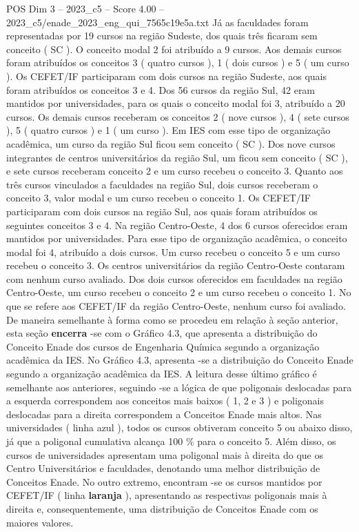 \begin{textsample}{POS Dim 3 – 2023\_c5 – Score 4.00 – 2023\_c5/enade\_2023\_eng\_qui\_7565c19e5a.txt}
Já as faculdades foram representadas por 19 cursos na região Sudeste, dos quais três ficaram sem conceito ( SC ).
O conceito modal 2 foi atribuído a 9 cursos.
Aos demais cursos foram atribuídos os conceitos 3 ( quatro cursos ), 1 ( dois cursos ) e 5 ( um curso ).
Os CEFET/IF participaram com dois cursos na região Sudeste, aos quais foram atribuídos os conceitos 3 e 4.
Dos 56 cursos da região Sul, 42 eram mantidos por universidades, para os quais o conceito modal foi 3, atribuído a 20 cursos.
Os demais cursos receberam os conceitos 2 ( nove cursos ), 4 ( sete cursos ), 5 ( quatro cursos ) e 1 ( um curso ).
Em IES com esse tipo de organização acadêmica, um curso da região Sul ficou sem conceito ( SC ).
Dos nove cursos integrantes de centros universitários da região Sul, um ficou sem conceito ( SC ), e sete cursos receberam conceito 2 e um curso recebeu o conceito 3.
Quanto aos três cursos vinculados a faculdades na região Sul, dois cursos receberam o conceito 3, valor modal e um curso recebeu o conceito 1.
Os CEFET/IF participaram com dois cursos na região Sul, aos quais foram atribuídos os seguintes conceitos 3 e 4.
Na região Centro-Oeste, 4 dos 6 cursos oferecidos eram mantidos por universidades.
Para esse tipo de organização acadêmica, o conceito modal foi 4, atribuído a dois cursos.
Um curso recebeu o conceito 5 e um curso recebeu o conceito 3.
Os centros universitários da região Centro-Oeste contaram com nenhum curso avaliado.
Dos dois cursos oferecidos em faculdades na região Centro-Oeste, um curso recebeu o conceito 2 e um curso recebeu o conceito 1.
No que se refere aos CEFET/IF da região Centro-Oeste, nenhum curso foi avaliado.
De maneira semelhante à forma como se procedeu em relação à seção anterior, esta seção \textbf{encerra} -se com o Gráfico 4.3, que apresenta a distribuição do Conceito Enade dos cursos de Engenharia Química segundo a organização acadêmica da IES.
No Gráfico 4.3, apresenta -se a distribuição do Conceito Enade segundo a organização acadêmica da IES.
A leitura desse último gráfico é semelhante aos anteriores, seguindo -se a lógica de que poligonais deslocadas para a esquerda correspondem aos conceitos mais baixos ( 1, 2 e 3 ) e poligonais deslocadas para a direita correspondem a Conceitos Enade mais altos.
Nas universidades ( linha azul ), todos os cursos obtiveram conceito 5 ou abaixo disso, já que a poligonal cumulativa alcança 100 \% para o conceito 5.
Além disso, os cursos de universidades apresentam uma poligonal mais à direita do que os Centro Universitários e faculdades, denotando uma melhor distribuição de Conceitos Enade.
No outro extremo, encontram -se os cursos mantidos por CEFET/IF ( linha \textbf{laranja} ), apresentando as respectivas poligonais mais à direita e, consequentemente, uma distribuição de Conceitos Enade com os maiores valores.

\end{textsample}
